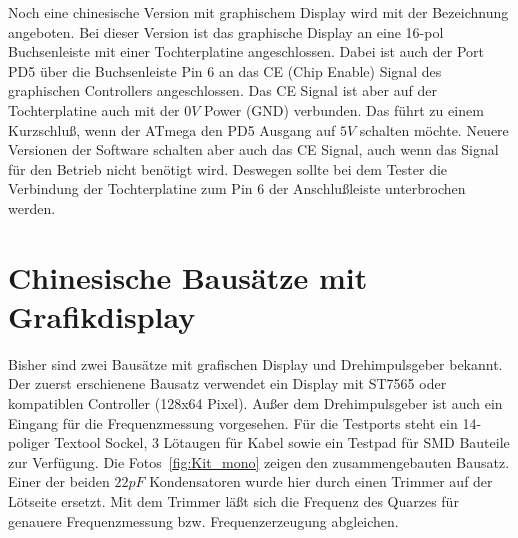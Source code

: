 Noch eine chinesische Version mit graphischem Display wird mit der Bezeichnung  angeboten.
Bei dieser Version ist das graphische Display an eine 16-pol Buchsenleiste mit einer Tochterplatine
angeschlossen.
Dabei ist auch der Port PD5 über die Buchsenleiste Pin 6 an das CE (Chip Enable) Signal
des graphischen Controllers angeschlossen. Das CE Signal ist aber auf der Tochterplatine auch mit der
\(0V\) Power (GND) verbunden.
Das führt zu einem Kurzschluß, wenn der ATmega den PD5 Ausgang auf \(5V\) schalten möchte.
Neuere Versionen der Software schalten aber auch das CE Signal, auch wenn das Signal für den Betrieb nicht
benötigt wird.
Deswegen sollte bei dem  Tester die Verbindung der Tochterplatine zum Pin 6 
der Anschlußleiste unterbrochen werden.

\section{Chinesische Bausätze mit Grafikdisplay}

Bisher sind zwei Bausätze mit grafischen Display und Drehimpulsgeber bekannt.
Der zuerst erschienene Bausatz verwendet ein Display mit ST7565 oder kompatiblen Controller (128x64 Pixel).
Außer dem Drehimpulsgeber ist  auch ein Eingang für die Frequenzmessung vorgesehen.
Für die Testports steht ein 14-poliger Textool Sockel, 3 Lötaugen für Kabel sowie ein Testpad
für SMD Bauteile zur Verfügung. 
Die Fotos~\ref{fig:Kit_mono} zeigen den zusammengebauten Bausatz.
Einer der beiden \(22 pF\) Kondensatoren 
wurde hier durch einen Trimmer auf der Lötseite ersetzt. Mit dem Trimmer läßt sich die Frequenz des Quarzes für genauere
Frequenzmessung bzw. Frequenzerzeugung abgleichen.

